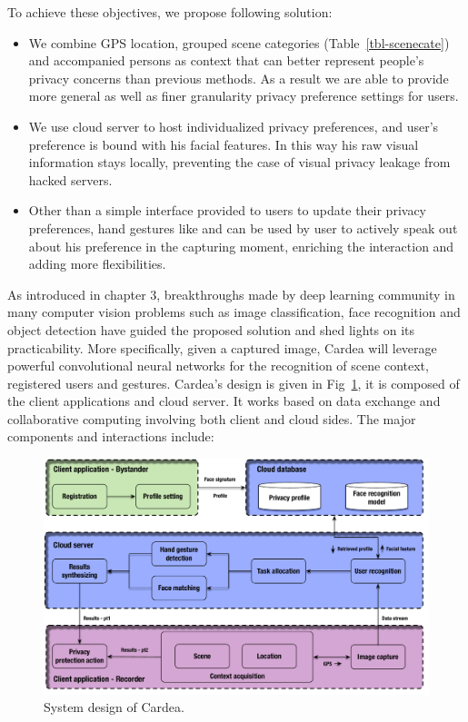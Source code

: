 To achieve these objectives, we propose following solution:
\begin{itemize}
  \item We combine GPS location, grouped scene categories (Table~\ref{tbl-scenecate}) and accompanied persons as context that can better represent people's privacy concerns than previous methods. As a result we are able to provide more general as well as finer granularity privacy preference settings for users.
\item We use cloud server to host individualized privacy preferences, and user's preference is bound with his facial features. In this way his raw visual information stays locally, preventing the case of visual privacy leakage from hacked servers.
\item Other than a simple interface provided to users to update their privacy preferences, hand gestures like  and  can be used by user to actively speak out about his preference in the capturing moment, enriching the interaction and adding more flexibilities.
\end{itemize}
As introduced in chapter 3, breakthroughs made by deep learning community in many computer vision problems such as image classification, face recognition and object detection have guided the proposed solution and shed lights on its practicability. More specifically, given a captured image, Cardea will leverage powerful convolutional neural networks for the recognition of scene context, registered users and gestures. Cardea's design is given in Fig~\ref{fig:ch4-cardeadesign}, it is composed of the client applications and cloud server. It works based on data exchange and collaborative computing involving both client and cloud sides. The major components and interactions include:
\begin{figure}[!htbp]
    \centering
    \includegraphics[width=1.0\textwidth]{figure/ch4-cardeadesign.pdf}
    \caption{System design of Cardea.}
    \label{fig:ch4-cardeadesign}
\end{figure}

